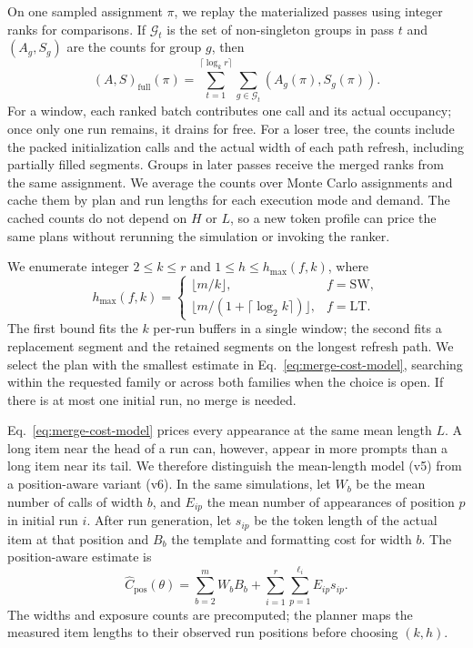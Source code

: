 On one sampled assignment $\pi$, we replay the materialized passes using integer ranks for comparisons. If $\mathcal G_t$ is the set of non-singleton groups in pass $t$ and $(A_g,S_g)$ are the counts for group $g$, then
\begin{equation}
  (A,S)_{\mathrm{full}}(\pi)=
  \sum_{t=1}^{\lceil\log_k r\rceil}
  \sum_{g\in\mathcal G_t}(A_g(\pi),S_g(\pi)).
  \label{eq:total-merge-cost}
\end{equation}
For a window, each ranked batch contributes one call and its actual occupancy; once only one run remains, it drains for free. For a loser tree, the counts include the packed initialization calls and the actual width of each path refresh, including partially filled segments. Groups in later passes receive the merged ranks from the same assignment. We average the counts over Monte Carlo assignments and cache them by plan and run lengths for each execution mode and demand. The cached counts do not depend on $H$ or $L$, so a new token profile can price the same plans without rerunning the simulation or invoking the ranker.

We enumerate integer $2\leq k\leq r$ and $1\leq h\leq h_{\max}(f,k)$, where
\begin{equation}
 h_{\max}(f,k)=
 \begin{cases}
   \lfloor m/k\rfloor, & f=\mathrm{SW},\\
   \lfloor m/(1+\lceil\log_2 k\rceil)\rfloor, & f=\mathrm{LT}.
 \end{cases}
 \label{eq:merge-capacity}
\end{equation}
The first bound fits the $k$ per-run buffers in a single window; the second fits a replacement segment and the retained segments on the longest refresh path. We select the plan with the smallest estimate in Eq.~\eqref{eq:merge-cost-model}, searching within the requested family or across both families when the choice is open. If there is at most one initial run, no merge is needed.

Eq.~\eqref{eq:merge-cost-model} prices every appearance at the same mean length $L$. A long item near the head of a run can, however, appear in more prompts than a long item near its tail. We therefore distinguish the mean-length model (v5) from a position-aware variant (v6). In the same simulations, let $W_b$ be the mean number of calls of width $b$, and $E_{ip}$ the mean number of appearances of position $p$ in initial run $i$. After run generation, let $s_{ip}$ be the token length of the actual item at that position and $B_b$ the template and formatting cost for width $b$. The position-aware estimate is
\begin{equation}
  \widehat C_{\mathrm{pos}}(\theta)=
  \sum_{b=2}^{m}W_b B_b+
  \sum_{i=1}^{r}\sum_{p=1}^{\ell_i}E_{ip}s_{ip}.
  \label{eq:cost-position-aware}
\end{equation}
The widths and exposure counts are precomputed; the planner maps the measured item lengths to their observed run positions before choosing $(k,h)$.

